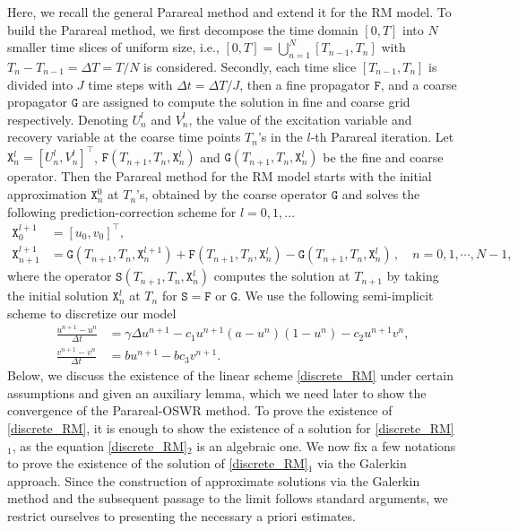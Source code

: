 \documentclass[11pt]{article}
\begin{document}
Here, we recall the general Parareal method and extend it for the RM model.
To build the Parareal method, we first decompose the time domain $[0, T]$ into $N$ smaller time slices of uniform size, i.e., $[0, T]=\bigcup\limits_{n=1}^{N}[T_{n-1}, T_n]$ with $T_{n}- T_{n-1}=\Delta T=T/N$ is considered. Secondly, each time slice $[T_{n-1}, T_n]$ is divided into $J$ time steps with $\Delta t=\Delta T/J$, then a fine propagator $\mathtt{F}$, and a coarse propagator $\mathtt{G}$ are assigned to compute the solution in fine and coarse grid respectively.
Denoting ${U}_n^{l}$ and ${V}_n^{l}$, the value of the excitation variable and recovery variable at the coarse time points $T_n$'s in the $l$-th Parareal iteration. Let $\mathtt{X}_n^l=[U_n^l, V_n^l]^{\top}$, $\mathtt{F}(T_{n+1}, T_n, \mathtt{X}_n^{l})$ and $\mathtt{G}(T_{n+1}, T_n, \mathtt{X}_n^{l})$ be the fine and coarse operator. Then the Parareal method for the RM model starts with the initial approximation $\mathtt{X}_n^0$ at $T_n$'s, obtained by the coarse operator $\mathtt{G}$ and solves the following prediction-correction scheme for $l=0, 1,...$
\begin{equation}\label{parareal_rm}
    \begin{aligned}
       \mathtt{X}_0^{l+1} & =[ u_0, v_0]^{\top},\\
      \mathtt{X}_{n+1}^{l+1} & =\mathtt{G}(T_{n+1}, T_n, \mathtt{X}_n^{l+1})+\mathtt{F}(T_{n+1}, T_n, \mathtt{X}_n^l)-\mathtt{G}(T_{n+1}, T_n, \mathtt{X}_n^l)\,, \quad n=0,1,\cdots, N-1,
    \end{aligned}       
\end{equation}
where the operator $\mathtt{S}(T_{n+1}, T_{n}, \mathtt{X}_{n}^{l})$ computes the solution at $T_{n+1}$ by taking the initial solution $\mathtt{X}_{n}^{l}$ at $T_{n}$ for $\mathtt{S} = \mathtt{F}$ or $\mathtt{G}$. We use the following semi-implicit scheme to discretize our model 
\begin{equation}\label{discrete_RM}
\begin{aligned}
\frac{u^{n+1} -u^{n}}{\Delta t} & = \gamma \Delta u^{n+1} - c_1u^{n+1}(a-u^n)(1-u^n) - c_2u^{n+1}v^n,\\
\frac{v^{n+1} -v^{n}}{\Delta t} & = bu^{n+1} - bc_3v^{n+1}.
\end{aligned}
\end{equation} 
Below, we discuss the existence of the linear scheme \eqref{discrete_RM} under certain assumptions and given an auxiliary lemma, which we need later to show the convergence of the Parareal-OSWR method. To prove the existence of \eqref{discrete_RM}, it is enough to show the existence of a solution for \eqref{discrete_RM}$_1$, as the equation \eqref{discrete_RM}$_2$ is an algebraic one. We now fix a few notations to prove the existence of the solution of \eqref{discrete_RM}$_1$ via the Galerkin approach. Since the construction of approximate solutions via the Galerkin method and the subsequent passage to the limit follows standard arguments, we restrict ourselves to presenting the necessary a priori estimates. 
\end{document}
